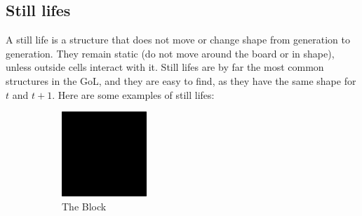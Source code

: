 \documentclass{l4proj}
\begin{document}
\subsection{Still lifes}

A still life is a structure that does not move or change shape from generation to generation. They remain static (do not move around the board or in shape), unless outside cells interact with it. Still lifes are by far the most common structures in the GoL, and they are easy to find, as they have the same shape for $t$ and $t+1$. Here are some examples of still lifes:

\begin{figure}[h]
\centering
\begin{subfigure}[b]{0.25\textwidth}
    \includegraphics[width=\textwidth]{dissertation/images/gol_structures/still_life_1.png} 
    \caption{The Block} %
    \label{fig:subim1}
\end{subfigure}
\hfill
\begin{subfigure}[b]{0.25\textwidth}

\end{subfigure}
\end{figure}
\end{document}
